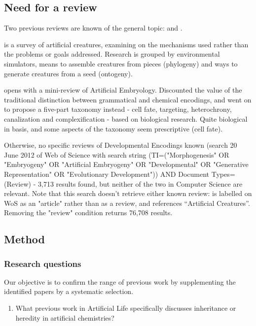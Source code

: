 \subsection{Need for a review}

Two previous reviews are known of the general topic: \cite{Duthen2010} and \cite{Stanley:2003fh}.

\Textcite{Duthen2010} is a survey of artificial creatures, examining on the mechanisms used rather than the problems or goals addressed. Research is grouped by environmental simulators, means to assemble creatures from pieces (phylogeny) and 
ways to generate creatures from a seed (ontogeny).

\Textcite{Stanley:2003fh} opens with a mini-review of Artificial Embryology.
Discounted the value of the traditional distinction between grammatical and chemical encodings, and went on to propose a five-part taxonomy
instead - cell fate, targeting, heterochrony, canalization and complexification - based on biological research. Quite
biological in basis, and some aspects of the taxonomy seem prescriptive (\eg cell fate).

Otherwise, no specific reviews of Developmental Encodings known (search 20 June 2012 of Web of Science with search string
(TI=("Morphogenesis" OR "Embryogeny" OR "Artificial Embryogeny" OR "Developmental" OR "Generative Representation" OR
"Evolutionary Development")) AND Document Types=(Review) - 3,713 results found, but neither of the two in Computer
Science are relevant. Note that this search doesn't retrieve either known review: \cite{Stanley:2003fh} is labelled on WoS as an
"article" rather than as a review, and \cite{Duthen2010} references ``Artificial Creatures''. Removing the "review" condition returns 76,708 results.

\subsection{Method}

\subsubsection{Research questions}
Our objective is to confirm the range of previous work by supplementing the identified papers by a systematic selection.

\begin{enumerate}[label=RQ\arabic*:]
	\item What previous work in Artificial Life specifically discusses inheritance or heredity in artificial chemistries?
\end{enumerate}

